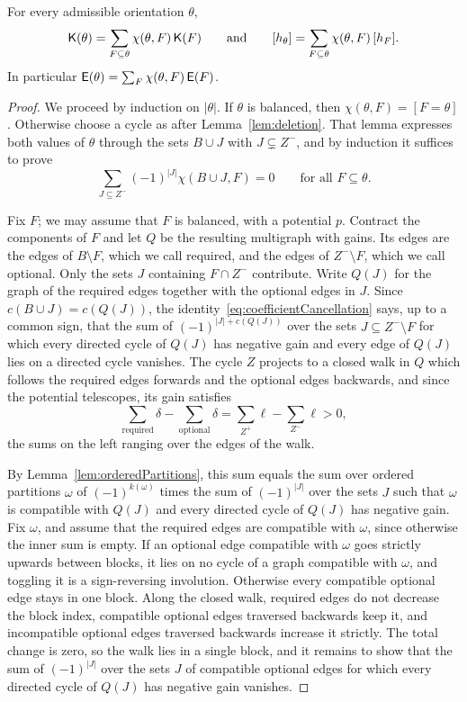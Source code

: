 \begin{proposition}\label{prop:balancedExpansion}
For every admissible orientation $\theta$,
\[
 \mathsf{K}(\theta)=\sum_{F\subseteq\theta}\chi(\theta,F)\,\mathsf{K}(F)
 \qquad\text{and}\qquad
 [h_\theta]=\sum_{F\subseteq\theta}\chi(\theta,F)\,[h_F].
\]
In particular $\mathsf{E}(\theta)=\sum_F\chi(\theta,F)\,\mathsf{E}(F)$.
\end{proposition}

\begin{proof}
We proceed by induction on $|\theta|$.
If $\theta$ is balanced, then $\chi(\theta,F)=[F=\theta]$.
Otherwise choose a cycle as after Lemma~\ref{lem:deletion}.
That lemma expresses both values of $\theta$ through the sets $B\cup J$ with
$J\subsetneq Z^-$, and by induction it suffices to prove
\begin{equation}\label{eq:coefficientCancellation}
 \sum_{J\subseteq Z^-}(-1)^{|J|}\chi(B\cup J,F)=0
 \qquad\text{for all } F\subseteq\theta.
\end{equation}

Fix $F$; we may assume that $F$ is balanced, with a potential $p$.
Contract the components of $F$ and let $Q$ be the resulting multigraph with gains.
Its edges are the edges of $B\setminus F$, which we call required, and the
edges of $Z^-\setminus F$, which we call optional.
Only the sets $J$ containing $F\cap Z^-$ contribute.
Write $Q(J)$ for the graph of the required edges together with the optional
edges in $J$.
Since $c(B\cup J)=c(Q(J))$, the identity~\eqref{eq:coefficientCancellation}
says, up to a common sign, that the sum of $(-1)^{|J|+c(Q(J))}$ over the sets
$J\subseteq Z^-\setminus F$ for which every directed cycle of $Q(J)$ has negative
gain and every edge of $Q(J)$ lies on a directed cycle vanishes.
The cycle $Z$ projects to a closed walk in $Q$ which follows the required edges
forwards and the optional edges backwards, and since the potential
telescopes, its gain satisfies
\begin{equation}\label{eq:walkGain}
 \sum_{\text{required}}\delta-\sum_{\text{optional}}\delta
 =\sum_{Z^+}\ell-\sum_{Z^-}\ell>0,
\end{equation}
the sums on the left ranging over the edges of the walk.

By Lemma~\ref{lem:orderedPartitions}, this sum equals the sum over ordered
partitions $\omega$ of $(-1)^{k(\omega)}$ times the sum of $(-1)^{|J|}$ over the
sets $J$ such that $\omega$ is compatible with $Q(J)$ and every directed cycle of
$Q(J)$ has negative gain.
Fix $\omega$, and assume that the required edges are compatible with $\omega$,
since otherwise the inner sum is empty.
If an optional edge compatible with $\omega$ goes strictly upwards between blocks,
it lies on no cycle of a graph compatible with $\omega$, and toggling it is a
sign-reversing involution.
Otherwise every compatible optional edge stays in one block.
Along the closed walk, required edges do not decrease the block index,
compatible optional edges traversed backwards keep it, and incompatible optional
edges traversed backwards increase it strictly.
The total change is zero, so the walk lies in a single block, and it remains to
show that the sum of $(-1)^{|J|}$ over the sets $J$ of compatible optional edges
for which every directed cycle of $Q(J)$ has negative gain vanishes.


\end{proof}
